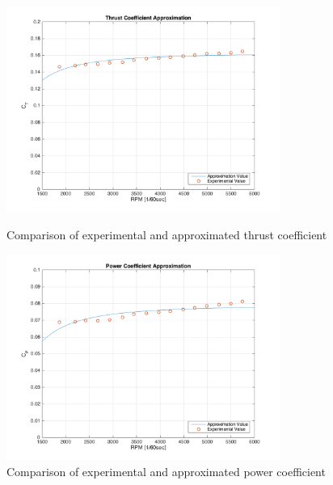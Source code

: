 \begin{figure}
    \centering
    \includegraphics[width=0.8\textwidth]{graphics/Ct_fig.png}
    \caption{Comparison of experimental and approximated thrust coefficient}
    \label{fig:ct}
    
    \vspace{1cm}
    
    \includegraphics[width=0.8\textwidth]{graphics/Cp_fig.png}
    \caption{Comparison of experimental and approximated power coefficient}
    \label{fig:cp}
\end{figure}

